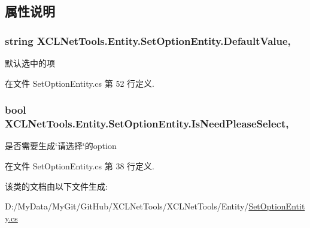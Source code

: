\subsection{属性说明}
\hypertarget{class_x_c_l_net_tools_1_1_entity_1_1_set_option_entity_a504fe6ad96f52cb7eb9f8a4e64e07723}{
\subsubsection[{Default\-Value}]{\setlength{\rightskip}{0pt plus 5cm}string X\-C\-L\-Net\-Tools.\-Entity.\-Set\-Option\-Entity.\-Default\-Value\hspace{0.3cm}{\ttfamily [get]}, {\ttfamily [set]}}}\label{class_x_c_l_net_tools_1_1_entity_1_1_set_option_entity_a504fe6ad96f52cb7eb9f8a4e64e07723}


默认选中的项 



在文件 Set\-Option\-Entity.\-cs 第 52 行定义.

\hypertarget{class_x_c_l_net_tools_1_1_entity_1_1_set_option_entity_a22c7d14f09183bb9124fa9219663be6c}{
\subsubsection[{Is\-Need\-Please\-Select}]{\setlength{\rightskip}{0pt plus 5cm}bool X\-C\-L\-Net\-Tools.\-Entity.\-Set\-Option\-Entity.\-Is\-Need\-Please\-Select\hspace{0.3cm}{\ttfamily [get]}, {\ttfamily [set]}}}\label{class_x_c_l_net_tools_1_1_entity_1_1_set_option_entity_a22c7d14f09183bb9124fa9219663be6c}


是否需要生成\char`\"{}请选择\char`\"{}的option 



在文件 Set\-Option\-Entity.\-cs 第 38 行定义.



该类的文档由以下文件生成\-:\begin{DoxyCompactItemize}
\item 
D\-:/\-My\-Data/\-My\-Git/\-Git\-Hub/\-X\-C\-L\-Net\-Tools/\-X\-C\-L\-Net\-Tools/\-Entity/\hyperlink{_set_option_entity_8cs}{Set\-Option\-Entity.\-cs}\end{DoxyCompactItemize}
